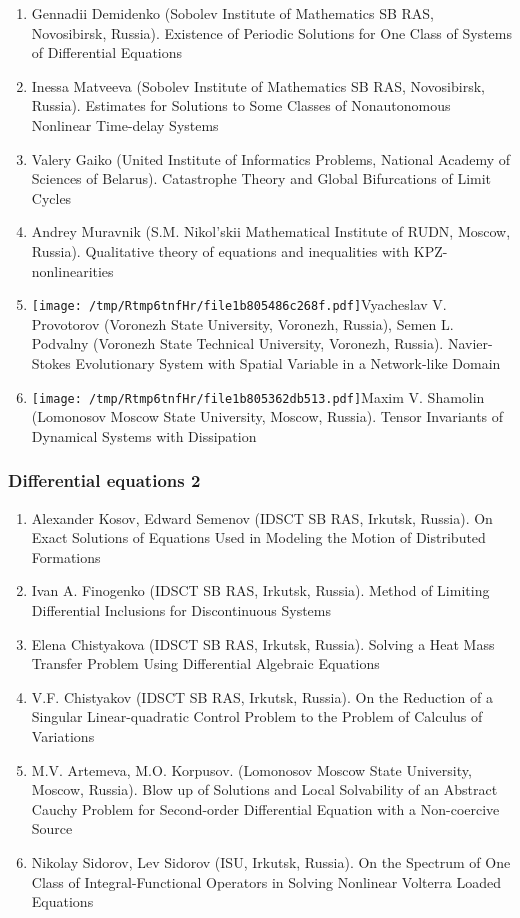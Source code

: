 \documentclass[
]{article}
\providecommand{\tightlist}{%
  \setlength{\itemsep}{0pt}\setlength{\parskip}{0pt}}
\begin{document}
\begin{enumerate}
\def\labelenumi{\arabic{enumi}.}
\tightlist
\item
  Gennadii Demidenko (Sobolev Institute of Mathematics SB RAS,
  Novosibirsk, Russia). Existence of Periodic Solutions for One Class of
  Systems of Differential Equations
\item
  Inessa Matveeva (Sobolev Institute of Mathematics SB RAS, Novosibirsk,
  Russia). Estimates for Solutions to Some Classes of Nonautonomous
  Nonlinear Time-delay Systems
\item
  Valery Gaiko (United Institute of Informatics Problems, National
  Academy of Sciences of Belarus). Catastrophe Theory and Global
  Bifurcations of Limit Cycles
\item
  Andrey Muravnik (S.M. Nikol'skii Mathematical Institute of RUDN,
  Moscow, Russia). Qualitative theory of equations and inequalities with
  KPZ-nonlinearities
\item
  \protect\texttt{[image: /tmp/Rtmp6tnfHr/file1b805486c268f.pdf]}Vyacheslav
  V. Provotorov (Voronezh State University, Voronezh, Russia), Semen L.
  Podvalny (Voronezh State Technical University, Voronezh, Russia).
  Navier-Stokes Evolutionary System with Spatial Variable in a
  Network-like Domain
\item
  \protect\texttt{[image: /tmp/Rtmp6tnfHr/file1b805362db513.pdf]}Maxim
  V. Shamolin (Lomonosov Moscow State University, Moscow, Russia).
  Tensor Invariants of Dynamical Systems with Dissipation
\end{enumerate}

\hypertarget{de2}{%
\subsubsection{Differential equations 2}\label{de2}}

\begin{enumerate}
\def\labelenumi{\arabic{enumi}.}
\tightlist
\item
  Alexander Kosov, Edward Semenov (IDSCT SB RAS, Irkutsk, Russia). On
  Exact Solutions of Equations Used in Modeling the Motion of
  Distributed Formations
\item
  Ivan A. Finogenko (IDSCT SB RAS, Irkutsk, Russia). Method of Limiting
  Differential Inclusions for Discontinuous Systems
\item
  Elena Chistyakova (IDSCT SB RAS, Irkutsk, Russia). Solving a Heat Mass
  Transfer Problem Using Differential Algebraic Equations
\item
  V.F. Chistyakov (IDSCT SB RAS, Irkutsk, Russia). On the Reduction of a
  Singular Linear-quadratic Control Problem to the Problem of Calculus
  of Variations
\item
  M.V. Artemeva, M.O. Korpusov. (Lomonosov Moscow State University,
  Moscow, Russia). Blow up of Solutions and Local Solvability of an
  Abstract Cauchy Problem for Second-order Differential Equation with a
  Non-coercive Source
\item
  Nikolay Sidorov, Lev Sidorov (ISU, Irkutsk, Russia). On the Spectrum
  of One Class of Integral-Functional Operators in Solving Nonlinear
  Volterra Loaded Equations
\end{enumerate}
\end{document}
